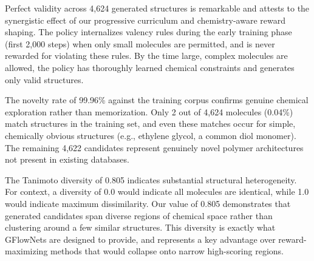 \documentclass[twocolumn,10pt]{article}
\begin{document}
\begin{table}[!ht]
\centering
\caption{Generation quality metrics for the complete set of 4,624 generated polymer candidates.}
\label{tab:quality}
\end{table}

Perfect validity across 4,624 generated structures is remarkable and attests to the synergistic effect of our progressive curriculum and chemistry-aware reward shaping. The policy internalizes valency rules during the early training phase (first 2,000 steps) when only small molecules are permitted, and is never rewarded for violating these rules. By the time large, complex molecules are allowed, the policy has thoroughly learned chemical constraints and generates only valid structures.

The novelty rate of 99.96\% against the training corpus confirms genuine chemical exploration rather than memorization. Only 2 out of 4,624 molecules (0.04\%) match structures in the training set, and even these matches occur for simple, chemically obvious structures (e.g., ethylene glycol, a common diol monomer). The remaining 4,622 candidates represent genuinely novel polymer architectures not present in existing databases.

The Tanimoto diversity of 0.805 indicates substantial structural heterogeneity. For context, a diversity of 0.0 would indicate all molecules are identical, while 1.0 would indicate maximum dissimilarity. Our value of 0.805 demonstrates that generated candidates span diverse regions of chemical space rather than clustering around a few similar structures. This diversity is exactly what GFlowNets are designed to provide, and represents a key advantage over reward-maximizing methods that would collapse onto narrow high-scoring regions.
\end{document}
